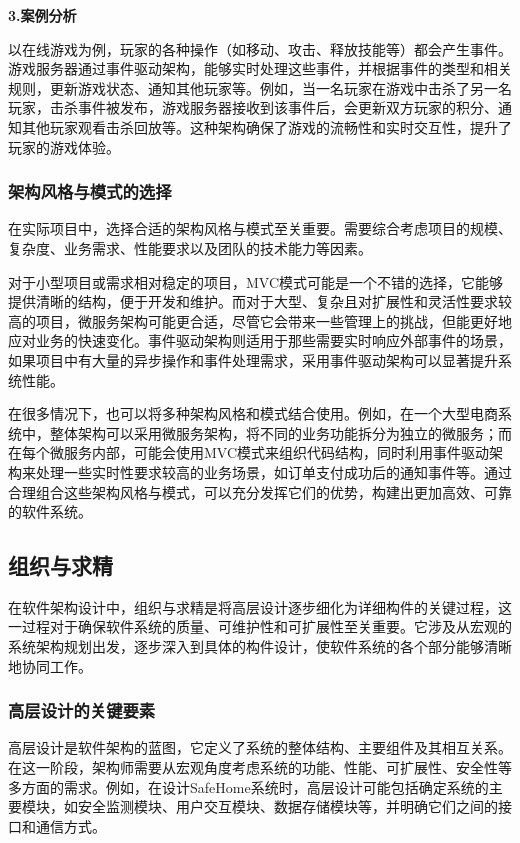 \textbf{3.案例分析}

以在线游戏为例，玩家的各种操作（如移动、攻击、释放技能等）都会产生事件。游戏服务器通过事件驱动架构，能够实时处理这些事件，并根据事件的类型和相关规则，更新游戏状态、通知其他玩家等。例如，当一名玩家在游戏中击杀了另一名玩家，击杀事件被发布，游戏服务器接收到该事件后，会更新双方玩家的积分、通知其他玩家观看击杀回放等。这种架构确保了游戏的流畅性和实时交互性，提升了玩家的游戏体验。

\subsubsection{架构风格与模式的选择}

在实际项目中，选择合适的架构风格与模式至关重要。需要综合考虑项目的规模、复杂度、业务需求、性能要求以及团队的技术能力等因素。

对于小型项目或需求相对稳定的项目，MVC模式可能是一个不错的选择，它能够提供清晰的结构，便于开发和维护。而对于大型、复杂且对扩展性和灵活性要求较高的项目，微服务架构可能更合适，尽管它会带来一些管理上的挑战，但能更好地应对业务的快速变化。事件驱动架构则适用于那些需要实时响应外部事件的场景，如果项目中有大量的异步操作和事件处理需求，采用事件驱动架构可以显著提升系统性能。

在很多情况下，也可以将多种架构风格和模式结合使用。例如，在一个大型电商系统中，整体架构可以采用微服务架构，将不同的业务功能拆分为独立的微服务；而在每个微服务内部，可能会使用MVC模式来组织代码结构，同时利用事件驱动架构来处理一些实时性要求较高的业务场景，如订单支付成功后的通知事件等。通过合理组合这些架构风格与模式，可以充分发挥它们的优势，构建出更加高效、可靠的软件系统。

\subsection{组织与求精}

在软件架构设计中，组织与求精是将高层设计逐步细化为详细构件的关键过程，这一过程对于确保软件系统的质量、可维护性和可扩展性至关重要。它涉及从宏观的系统架构规划出发，逐步深入到具体的构件设计，使软件系统的各个部分能够清晰地协同工作。

\subsubsection{高层设计的关键要素}

高层设计是软件架构的蓝图，它定义了系统的整体结构、主要组件及其相互关系。在这一阶段，架构师需要从宏观角度考虑系统的功能、性能、可扩展性、安全性等多方面的需求。例如，在设计SafeHome系统时，高层设计可能包括确定系统的主要模块，如安全监测模块、用户交互模块、数据存储模块等，并明确它们之间的接口和通信方式。

